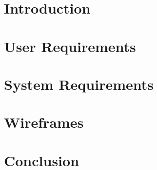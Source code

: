 \section{Introduction}
\section{User Requirements}
\section{System Requirements}
\section{Wireframes}
\section{Conclusion}